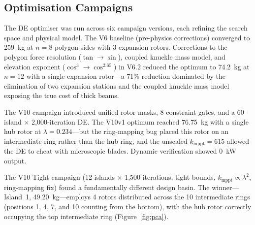 \documentclass[11pt,a4paper]{article}
\begin{document}
\subsection{Optimisation Campaigns}

The DE optimiser was run across six campaign versions, each refining the search space and physical model. The V6 baseline (pre-physics corrections) converged to 259~kg at $n = 8$ polygon sides with 3 expansion rotors. Corrections to the polygon force resolution ($\tan \to \sin$), coupled knuckle mass model, and elevation exponent ($\cos^3 \to \cos^{2.65}$) in V6.2 reduced the optimum to 74.2~kg at $n = 12$ with a single expansion rotor—a 71\% reduction dominated by the elimination of two expansion stations and the coupled knuckle mass model exposing the true cost of thick beams.

The V10 campaign introduced unified rotor masks, 8 constraint gates, and a 60-island $\times$ 2,000-iteration DE. The V10v1 optimum reached 76.75~kg with a single hub rotor at $\lambda = 0.234$—but the ring-mapping bug placed this rotor on an intermediate ring rather than the hub ring, and the unscaled $k_{\mathrm{mppt}} = 615$ allowed the DE to cheat with microscopic blades. Dynamic verification showed 0~kW output.

The V10 Tight campaign (12 islands $\times$ 1,500 iterations, tight bounds, $k_{\mathrm{mppt}} \propto \lambda^2$, ring-mapping fix) found a fundamentally different design basin. The winner—Island~1, 49.20~kg—employs 4 rotors distributed across the 10 intermediate rings (positions 1, 4, 7, and 10 counting from the bottom), with the hub rotor correctly occupying the top intermediate ring (Figure~\ref{fig:pca}).
\end{document}
